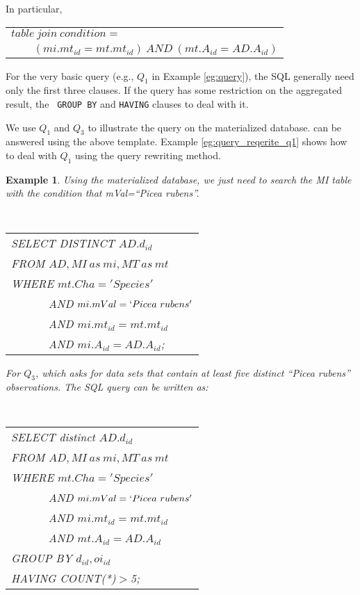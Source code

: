 \documentclass[conference]{IEEEtran}
\newtheorem{example}{\bf Example}[section]
\begin{document}
In particular, 

\vspace{0.1in}
\begin{tabular}{l}
$table~join~condition=$\\
$\qquad (mi.mt_{id}=mt.mt_{id})~AND~(mt.A_{id}=AD.A_{id})$
\end{tabular}
\vspace{0.1in}

For the very basic query (e.g., $Q_1$ in Example \ref{eg:query}), the
SQL generally need only the first three clauses. 
If the query has some restriction on the aggregated result, the {\tt
  GROUP BY} and {\tt HAVING} clauses to deal with it. 

We use $Q_1$ and $Q_3$ to illustrate the query on the materialized
database. 
can be answered using the above
template. 
Example \ref{eg:query_reqerite_q1} shows how to deal with $Q_1$ using
the query rewriting method. 

\begin{example} \label{eg:materialize_db_q1}
Using the  materialized database,  we just need to search the MI table
with the condition that {\em mVal=``Picea rubens''}.

\vspace{0.1in}
{\tt 
\begin{tabular}{l}
SELECT DISTINCT $AD.d_{id}$\\
FROM $AD, MI~as~mi, MT~as~mt$\\ 
WHERE $mt.Cha='Species'$ \\
$\qquad\quad$ AND $mi.mVal = `Picea~rubens'$\\
$\qquad\quad$ AND $mi.mt_{id}=mt.mt_{id}$\\
$\qquad\quad$ AND $mi.A_{id}=AD.A_{id}$; 
\end{tabular}
}
\vspace{0.1in}

For $Q_3$, which asks for data sets that contain at
least five distinct ``Picea rubens'' observations.
The SQL query can be written as: 

\vspace{0.1in}
{\tt 
\begin{tabular}{l}
SELECT distinct $AD.d_{id}$\\
FROM $AD, MI~as~mi, MT~as~mt$\\
WHERE $mt.Cha='Species'$ \\
$\qquad\quad$ AND $mi.mVal = `Picea~rubens'$\\
$\qquad\quad$ AND $mi.mt_{id}=mt.mt_{id}$\\
$\qquad\quad$ AND $mt.A_{id}=AD.A_{id}$\\
GROUP BY $d_{id},oi_{id}$\\
HAVING COUNT(*)$>$5; 
}
\end{tabular}
}
\vspace{0.1in}
\end{example}
\end{document}
